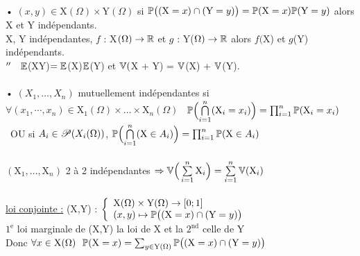 \documentclass[12 pt]{book}
\begin{document}
\begin{flushleft}
\begin{doublespace}
	\text{ }\\
	• $(x,y)\in\text{X}(\Omega)\times \text{Y}(\Omega)$ si $\mathbb{P}\big( (\text{X} = x) \cap (\text{Y} = y) \big) = \mathbb{P}(\text{X} =x ) \mathbb{P} (\text{Y} = y)$ alors X et Y indépendants.\\
	X, Y indépendantes, $f$ : X$(\Omega) \rightarrow \mathbb{R}$ et $g$ : Y($\Omega) \rightarrow \mathbb{R}$ alors $f($X) et $g$(Y) indépendants.\\
	\qquad $''  \quad \mathbb{E}$(XY)$ = \mathbb{E}$(X)$\mathbb{E}$(Y) et $\mathbb{V}($X + Y) = $\mathbb{V}$(X) + $\mathbb{V}$(Y).\\
	\text{ }\\
	• $(X_1,\dots, X_n)$ mutuellement indépendantes si $\forall (x_1,\cdots,x_n)\in \text{X}_1(\Omega)\times \dots \times \text{X}_n(\Omega)$ \ $\mathbb{P} \Big( \underset{i = 1}{\overset{n}{\bigcap}} (\text{X}_i = x_i) \Big) = \prod_{ i = 1}^n \mathbb{P} (\text{X}_i = x_i)$ \ OU si $A_i\in \mathscr{P}(X_i(\Omega))$, $\mathbb{P} \Big( \underset{i = 1}{\overset{n}{\bigcap}} (\text{X}\in A_i) \Big) = \prod_{ i = 1}^n \mathbb{P} (\text{X}\in A_i)$\\
	\text{ }\\
	$(\text{X}_1,\dots,\text{X}_n)$ 2 à 2 indépendantes $\Rightarrow\mathbb{V} \Big( \sum\limits_{i = 1}^n \text{X}_i  \Big)= \sum\limits_{i = 1}^n \mathbb{V}(\text{X}_i)$\\
	
	\text{ }\\
	\underline{ loi conjointe :} (X,Y) : $\left\{\begin{array}{ll} \text{X}(\Omega)\times \text{Y}(\Omega) \rightarrow [0; 1] \\ (x,y) \mapsto \mathbb{P} \big( (\text{X} = x) \cap (\text{Y} = y) \big) \end{array} \right.$\\
	$1^{\text{e}}$ loi marginale de (X,Y) la loi de X et la $2^{\text{nd}}$ celle de Y\\
	Donc $\forall x\in \text{X}(\Omega) \ \ \bP(\text{X} = x) = \sum_{y\in \text{Y}(\Omega)} \bP \big( (\text{X} = x) \cap (\text{Y} = y) \big)$\\


\end{doublespace}
\end{flushleft}
\end{document}
